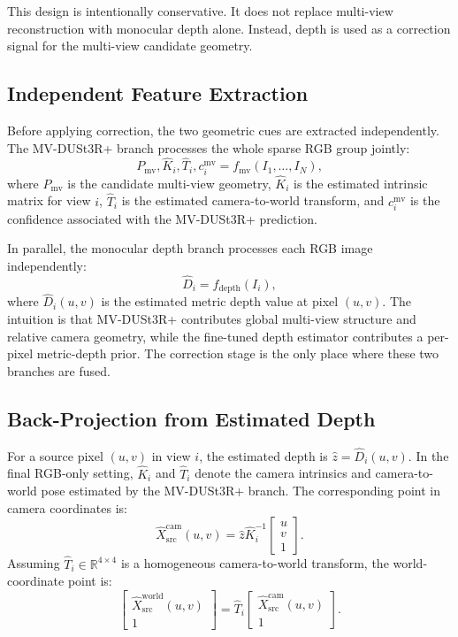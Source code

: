 \documentclass[12pt,a4paper]{article}
\newcommand{\mvdp}{MV-DUSt3R+}
\begin{document}
This design is intentionally conservative. It does not replace multi-view reconstruction with monocular depth alone. Instead, depth is used as a correction signal for the multi-view candidate geometry.

\subsection{Independent Feature Extraction}
Before applying correction, the two geometric cues are extracted independently. The \mvdp{} branch processes the whole sparse RGB group jointly:
\[
P_{\mathrm{mv}}, \hat{K}_i, \hat{T}_i, c^{\mathrm{mv}}_i
= f_{\mathrm{mv}}(I_1,\ldots,I_N),
\]
where \(P_{\mathrm{mv}}\) is the candidate multi-view geometry, \(\hat{K}_i\) is the estimated intrinsic matrix for view \(i\), \(\hat{T}_i\) is the estimated camera-to-world transform, and \(c^{\mathrm{mv}}_i\) is the confidence associated with the \mvdp{} prediction.

In parallel, the monocular depth branch processes each RGB image independently:
\[
\hat{D}_i = f_{\mathrm{depth}}(I_i),
\]
where \(\hat{D}_i(u,v)\) is the estimated metric depth value at pixel \((u,v)\). The intuition is that \mvdp{} contributes global multi-view structure and relative camera geometry, while the fine-tuned depth estimator contributes a per-pixel metric-depth prior. The correction stage is the only place where these two branches are fused.

\subsection{Back-Projection from Estimated Depth}
For a source pixel \((u,v)\) in view \(i\), the estimated depth is \(\hat{z}=\hat{D}_i(u,v)\). In the final RGB-only setting, \(\hat{K}_i\) and \(\hat{T}_i\) denote the camera intrinsics and camera-to-world pose estimated by the \mvdp{} branch. The corresponding point in camera coordinates is:
\begin{equation}
\hat{X}^{\mathrm{cam}}_{\mathrm{src}}(u,v) =
\hat{z}\hat{K}_i^{-1}
\begin{bmatrix}
u\\v\\1
\end{bmatrix}.
\end{equation}
Assuming \(\hat{T}_i\in\mathbb{R}^{4\times4}\) is a homogeneous camera-to-world transform, the world-coordinate point is:
\begin{equation}
\begin{bmatrix}
\hat{X}^{\mathrm{world}}_{\mathrm{src}}(u,v)\\
1
\end{bmatrix}
=
\hat{T}_i
\begin{bmatrix}
\hat{X}^{\mathrm{cam}}_{\mathrm{src}}(u,v)\\
1
\end{bmatrix}.
\end{equation}
\end{document}
